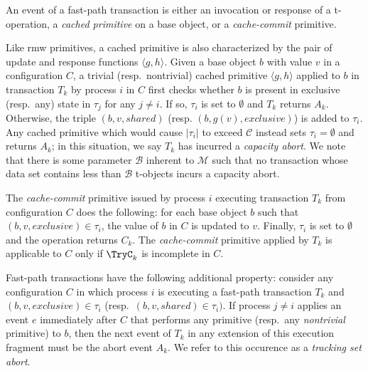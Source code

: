 An event of a fast-path transaction is either an invocation or response of a t-operation, 
a \emph{cached primitive} on a base object, or a \emph{cache-commit} primitive. 

Like rmw primitives, a cached primitive is also characterized by the pair of update and response functions $\langle g,h \rangle$.
Given a base object $b$ with value $v$ in a configuration $C$, 
a trivial (resp.\ nontrivial) cached primitive $\langle g,h \rangle$ applied to $b$ 
in transaction $T_k$ by process $i$ in $C$ first checks whether $b$ is present in exclusive (resp.\ any) state in $\tau_j$ 
for any $j\neq i$. If so, $\tau_i$ is set to $\emptyset$ and $T_k$ returns $A_k$. 
Otherwise, the triple $(b, v, shared)$ (resp. $(b, g(v), exclusive)$) is added to $\tau_i$. 
Any cached primitive which would cause $|\tau_i|$ to exceed $\mathcal{C}$ instead sets $\tau_i = \emptyset$ 
and returns $A_k$; in this situation, we say $T_k$ has incurred a \emph{capacity abort}. We note that there is some parameter $\mathcal{B}$
inherent to $\mathcal{M}$ such that no transaction whose data set contains 
less than $\mathcal{B}$ t-objects incurs a capacity abort.

The \emph{cache-commit} primitive issued by process $i$ executing transaction $T_k$ from configuration $C$
does the following: for each base object $b$ such that $(b,v,exclusive) \in \tau_i$, the value of $b$ in $C$ is updated to $v$. 
Finally, $\tau_i$ is set to $\emptyset$ and the operation returns $C_k$. 
The \emph{cache-commit} primitive applied by $T_k$ is applicable to $C$ only if $\TryC_k$ is incomplete in $C$.

Fast-path transactions have the following additional property:
consider any configuration $C$ in which process $i$ is executing a fast-path transaction $T_k$ and 
$(b,v,exclusive)\in\tau_i$ (resp.\ $(b,v,shared)\in\tau_i)$. 
If process $j\neq i$ applies an event $e$ immediately after $C$ that performs any primitive 
(resp.\ any \emph{nontrivial} primitive) to $b$, 
then the next event of $T_k$ in any extension of this execution fragment must be the abort event $A_k$. 
We refer to this occurence as a \emph{tracking set abort}. 

